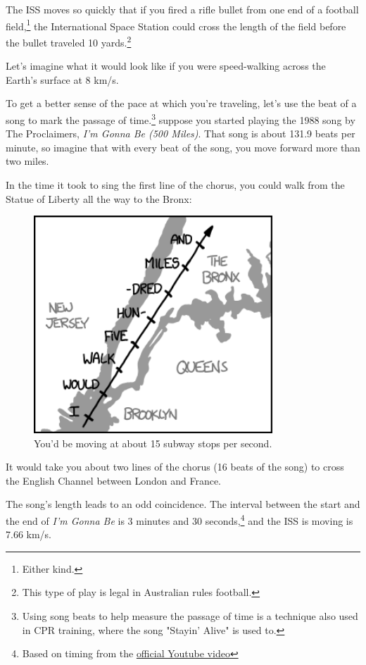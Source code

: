 {{The ISS moves so quickly that if you fired a rifle bullet from one end of a football field,{\footnote{Either kind.} } the International Space Station could cross the length of the field before the bullet traveled 10 yards.{\footnote{This type of play is legal in Australian rules football.} } }

{Let's imagine what it would look like if you were speed-walking across the Earth's surface at 8 km/s.}

{To get a better sense of the pace at which you're traveling, let's use the beat of a song to mark the passage of time.{\footnote{Using song beats to help measure the passage of time is a technique also used in CPR training, where the song "Stayin' Alive" is used to.} } suppose you started playing the 1988 song by The Proclaimers, \emph{I'm Gonna Be (500 Miles)}. That song is about 131.9 beats per minute, so imagine that with every beat of the song, you move forward more than two miles.}

{In the time it took to sing the first line of the chorus, you could walk from the Statue of Liberty all the way to the Bronx:}

\begin{figure}[!htbp]
\centering
\includegraphics[scale=0.5, max width=0.8\textwidth]{imgs/a/58/orbit_nyc.png}
\caption{You'd be moving at about 15 subway stops per second.}
\end{figure}

{It would take you about two lines of the chorus (16 beats of the song) to cross the English Channel between London and France.}

{The song's length leads to an odd coincidence. The interval between the start and the end of \emph{I'm Gonna Be} is 3 minutes and 30 seconds,{\footnote{Based on timing from the \href{http://www.youtube.com/watch?v=tbNlMtqrYS0}{official Youtube video}} } and the ISS is moving is 7.66 km/s.}

}
